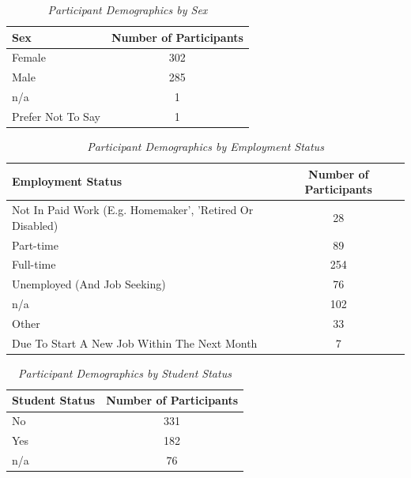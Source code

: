 \documentclass{article}
\begin{document}
\begin{table}[H]
\centering
\begin{tabular}{lc}
\toprule
Sex & Number of Participants \\
\midrule
Female & 302 \\
Male & 285 \\
n/a & 1 \\
Prefer Not To Say & 1 \\
\bottomrule
\end{tabular}
\caption{\textit{Participant Demographics by Sex}}
\end{table}

\begin{table}[H]
\centering
\begin{tabular}{lc}
\toprule
Employment Status & Number of Participants \\
\midrule
Not In Paid Work (E.g. Homemaker', 'Retired Or Disabled) & 28 \\
Part-time & 89 \\
Full-time & 254 \\
Unemployed (And Job Seeking) & 76 \\
n/a & 102 \\
Other & 33 \\
Due To Start A New Job Within The Next Month & 7 \\
\bottomrule
\end{tabular}
\caption{\textit{Participant Demographics by Employment Status}}
\end{table}


\begin{table}[H]
\centering
\begin{tabular}{lc}
\toprule
Student Status & Number of Participants \\
\midrule
No & 331 \\
Yes & 182 \\
n/a & 76 \\
\bottomrule
\end{tabular}
\caption{\textit{Participant Demographics by Student Status}}
\end{table}
\end{document}
